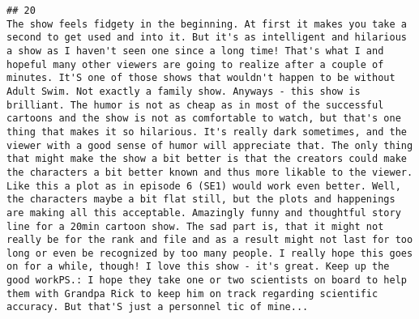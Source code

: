 \documentclass[
]{article}
\begin{document}
\begin{verbatim}
## 20                                                                                                                                                                                                                                                                                                                                                                                                                                                                                                                                                                                                                                                                                                                                                                                                                                                                                                     The show feels fidgety in the beginning. At first it makes you take a second to get used and into it. But it's as intelligent and hilarious a show as I haven't seen one since a long time! That's what I and hopeful many other viewers are going to realize after a couple of minutes. It'S one of those shows that wouldn't happen to be without Adult Swim. Not exactly a family show. Anyways - this show is brilliant. The humor is not as cheap as in most of the successful cartoons and the show is not as comfortable to watch, but that's one thing that makes it so hilarious. It's really dark sometimes, and the viewer with a good sense of humor will appreciate that. The only thing that might make the show a bit better is that the creators could make the characters a bit better known and thus more likable to the viewer. Like this a plot as in episode 6 (SE1) would work even better. Well, the characters maybe a bit flat still, but the plots and happenings are making all this acceptable. Amazingly funny and thoughtful story line for a 20min cartoon show. The sad part is, that it might not really be for the rank and file and as a result might not last for too long or even be recognized by too many people. I really hope this goes on for a while, though! I love this show - it's great. Keep up the good workPS.: I hope they take one or two scientists on board to help them with Grandpa Rick to keep him on track regarding scientific accuracy. But that'S just a personnel tic of mine...

\end{verbatim}
\end{document}
